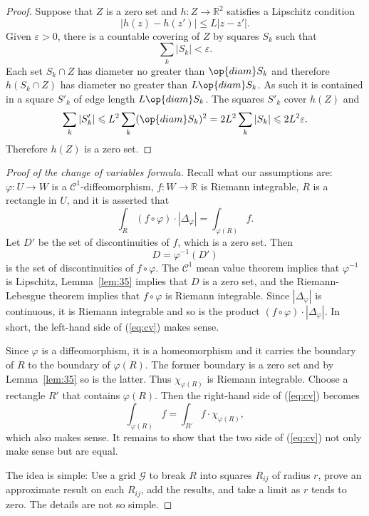 \documentclass[11pt]{article}
\begin{document}
\begin{proof}
  Suppose that $Z$ is a zero set and $h : Z \to \mathbb{R}^2$ satisfies a Lipschitz condition
  \[
    |h(z) - h(z')| \leqslant L |z - z'|.
  \]
  Given $\varepsilon > 0$, there is a countable covering of $Z$ by squares $S_k$ such that 
  \[
    \sum_k |S_k| < \varepsilon.
  \]
  Each set $S_k \cap Z$ has diameter no greater than $\op{diam} S_k$ and therefore $h(S_k \cap Z)$ has diameter no greater than $L \op{diam} S_k$.  As such it is contained in a square $S'_k$ of edge length $L \op{diam} S_k$.  The squares $S'_k$ cover $h(Z)$ and
  \[
    \sum_k |S'_k| \leqslant L^2 \sum_k (\op{diam} S_k)^2 = 2 L^2 \sum_k |S_k| \leqslant 2 L^2 \varepsilon.
  \]
  Therefore $h(Z)$ is a zero set.
\end{proof}

\begin{proof}[Proof of the change of variables formula]
  Recall what our assumptions are: $\varphi: U \to W$ is a $\mathcal{C}^1$-diffeomorphism, $f: W \to \mathbb{R}$ is Riemann integrable, $R$ is a rectangle in $U$, and it is asserted that
  \begin{equation}
    \label{eq:cv}
    \int_R (f \circ \varphi) \cdot | \Delta_\varphi | = \int_{\varphi(R)} f.
  \end{equation}
  Let $D'$ be the set of discontinuities of $f$, which is a zero set.  Then
  \[
    D = \varphi^{-1}(D')
  \]
  is the set of discontinuities of $f \circ \varphi$.  The $\mathcal{C}^1$ mean value theorem implies that $\varphi^{-1}$ is Lipschitz, Lemma~\ref{lem:35} implies that $D$ is a zero set, and the Riemann-Lebesgue theorem implies that $f \circ \varphi$ is Riemann integrable.  Since $| \Delta_\varphi |$ is continuous, it is Riemann integrable and so is the product $(f \circ \varphi) \cdot |\Delta_\varphi|$.  In short, the left-hand side of (\ref{eq:cv}) makes sense.

  Since $\varphi$ is a diffeomorphism, it is a homeomorphism and it carries the boundary of $R$ to the boundary of $\varphi(R)$.  The former boundary is a zero set and by Lemma~\ref{lem:35} so is the latter.  Thus $\chi_{\varphi(R)}$ is Riemann integrable.  Choose a rectangle $R'$ that contains $\varphi(R)$.  Then the right-hand side of (\ref{eq:cv}) becomes
  \[
    \int_{\varphi(R)} f = \int_{R'} f \cdot \chi_{\varphi(R)},
  \]
  which also makes sense.  It remains to show that the two side of (\ref{eq:cv}) not only make sense but are equal.

  The idea is simple: Use a grid $\mathcal{G}$ to break $R$ into squares $R_{ij}$ of radius $r$, prove an approximate result on each $R_{ij}$, add the results, and take a limit as $r$ tends to zero.  The details are not so simple.


\end{proof}
\end{document}
